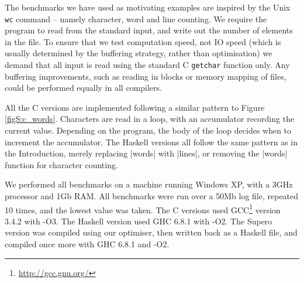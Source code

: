 The benchmarks we have used as motivating examples are inspired by the Unix \texttt{wc} command -- namely character, word and line counting. We require the program to read from the standard input, and write out the number of elements in the file. To ensure that we test computation speed, not IO speed (which is usually determined by the buffering strategy, rather than optimisation) we demand that all input is read using the standard C \texttt{getchar} function only. Any buffering improvements, such as reading in blocks or memory mapping of files, could be performed equally in all compilers.

All the C versions are implemented following a similar pattern to Figure \ref{figS:c_words}. Characters are read in a loop, with an accumulator recording the current value. Depending on the program, the body of the loop decides when to increment the accumulator. The Haskell versions all follow the same pattern as in the Introduction, merely replacing |words| with |lines|, or removing the |words| function for character counting.

We performed all benchmarks on a machine running Windows XP, with a 3GHz processor and 1Gb RAM. All benchmarks were run over a 50Mb log file, repeated 10 times, and the lowest value was taken. The C versions used GCC\footnote{\url{http://gcc.gnu.org/}} version 3.4.2 with -O3. The Haskell version used GHC 6.8.1 with -O2. The Supero version was compiled using our optimiser, then written back as a Haskell file, and compiled once more with GHC 6.8.1 and -O2.

